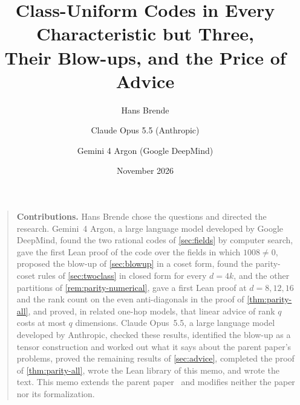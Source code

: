 \documentclass[11pt]{article}
\title{Class-Uniform Codes in Every Characteristic but Three,\\ Their Blow-ups, and the Price of Advice}
\author{Hans Brende \and Claude Opus 5.5 (Anthropic) \and Gemini 4 Argon (Google DeepMind)}
\date{November 2026}
\begin{document}
\maketitle

\begin{abstract}

\end{abstract}

\begin{quote}\small
\textbf{Contributions.} Hans Brende chose the questions and directed the research. Gemini~4 Argon, a large language
model developed by Google DeepMind, found the two rational codes of \cref{sec:fields} by computer search, gave the first
Lean proof of the code over the fields in which $1008\ne0$, proposed the blow-up of \cref{sec:blowup} in a coset form,
found the parity-coset rules of \cref{sec:twoclass} in closed form for every $d=4k$, and the other partitions of
\cref{rem:parity-numerical}, gave a first Lean proof at $d=8,12,16$ and the rank count on the even anti-diagonals in the
proof of \cref{thm:parity-all}, and proved, in related one-hop models, that linear advice of rank $q$ costs at most
$q$ dimensions. Claude Opus~5.5, a
large language model developed by Anthropic, checked these results, identified the blow-up as a tensor construction and
worked out what it says about the parent paper's problems, proved the remaining results of \cref{sec:advice}, completed the
proof of \cref{thm:parity-all}, wrote the Lean library of this memo, and wrote the text. This memo extends the parent paper~\cite{SeventeenthPaper2026} and
modifies neither the paper nor its formalization.
\end{quote}

\tableofcontents









\appendix





\end{document}
